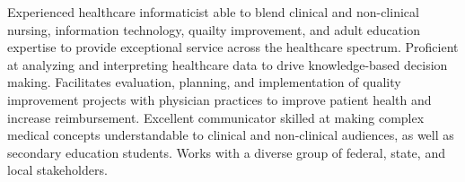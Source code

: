 

\begin{cvparagraph}

Experienced healthcare informaticist able to blend clinical and non-clinical nursing, information technology, quailty improvement, and adult education expertise to provide exceptional service across the healthcare spectrum.  Proficient at analyzing and interpreting healthcare data to drive knowledge-based decision making.  Facilitates evaluation, planning, and implementation of quality improvement projects with physician practices to improve patient health and increase reimbursement.  Excellent communicator skilled at making complex medical concepts understandable to clinical and non-clinical audiences, as well as secondary education students. Works with a diverse group of federal, state, and local stakeholders.
\end{cvparagraph}
